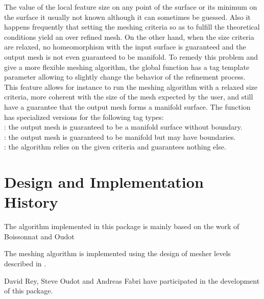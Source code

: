 The value of the local feature size on any point of the surface
or its minimum on the surface it usually not known
although it can sometimes be guessed. Also it happens frequently
that setting the meshing criteria so as to fulfill the theoretical
conditions yield an over refined mesh.
On the other hand, when the size criteria are relaxed,
no homeomorphism with the input surface is guaranteed
and the output mesh is not even guaranteed to be manifold.
To remedy this problem and give a more flexible
meshing algorithm, the global function 
 has a tag template parameter
allowing to slightly change the behavior of the refinement process.
This feature allows for instance to run the meshing
algorithm with a relaxed size criteria, more coherent
with the size of the mesh expected by the user,
and still have a guarantee that
the output mesh forms a manifold surface.
The function  has specialized versions
for the following  tag types: \\
: the output mesh is guaranteed to be a manifold
surface without boundary.\\
: the output mesh is guaranteed to be
manifold but may have boundaries.\\
: the algorithm relies on the given criteria and
guarantees nothing else.




\section{Design and Implementation History}

The algorithm implemented in this package
is mainly based on the  work of Boissonnat and Oudot
\cite{cgal:bo-pgsms-05}

The meshing algorithm is implemented using the design of mesher levels
described in \cite{cgal:ry-gsddrm-06}. 

David Rey, Steve Oudot and Andreas Fabri have participated
in the development of this package.




